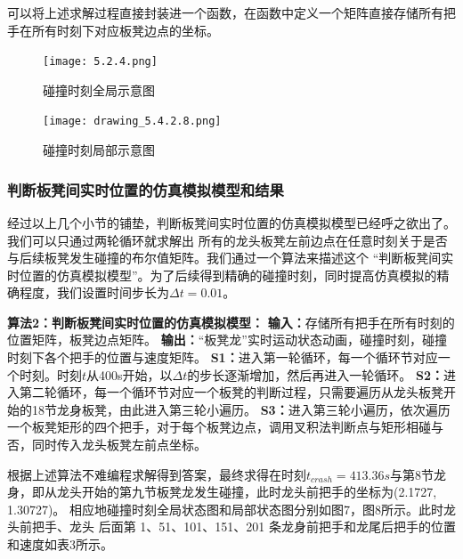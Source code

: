 \documentclass{cumcmthesis1}
\begin{document}
可以将上述求解过程直接封装进一个函数，在函数中定义一个矩阵直接存储所有把手在所有时刻下对应板凳边点的坐标。
\begin{figure}
    \caption{碰撞时刻全局示意图}
    \centering    
    \texttt{[image: 5.2.4.png]}
\end{figure}
\begin{figure}
    \caption{碰撞时刻局部示意图}
    \centering    
    \texttt{[image: drawing\_5.4.2.8.png]}
\end{figure}
\subsubsection{判断板凳间实时位置的仿真模拟模型和结果}
经过以上几个小节的铺垫，判断板凳间实时位置的仿真模拟模型已经呼之欲出了。我们可以只通过两轮循环就求解出
所有的龙头板凳左前边点在任意时刻关于是否与后续板凳发生碰撞的布尔值矩阵。我们通过一个算法来描述这个
“判断板凳间实时位置的仿真模拟模型”。为了后续得到精确的碰撞时刻，同时提高仿真模拟的精确程度，我们设置时间步长为$\Delta t=0.01$。
\par
\textbf{算法2：判断板凳间实时位置的仿真模拟模型：}
\newline
\noindent
\textbf{输入：}存储所有把手在所有时刻的位置矩阵，板凳边点矩阵。
\newline
\noindent
\textbf{输出：}“板凳龙”实时运动状态动画，碰撞时刻，碰撞时刻下各个把手的位置与速度矩阵。
\newline
\noindent
\textbf{S1：}进入第一轮循环，每一个循环节对应一个时刻。时刻$t$从400s开始，以$\Delta t$的步长逐渐增加，然后再进入一轮循环。
\newline
\noindent
\textbf{S2：}进入第二轮循环，每一个循环节对应一个板凳的判断过程，只需要遍历从龙头板凳开始的18节龙身板凳，由此进入第三轮小遍历。
\newline
\noindent
\textbf{S3：}进入第三轮小遍历，依次遍历一个板凳矩形的四个把手，对于每个板凳边点，调用叉积法判断点与矩形相碰与否，同时传入龙头板凳左前点坐标。
\par
根据上述算法不难编程求解得到答案，最终求得在时刻$t_{crash}=413.36s$与第8节龙身，即从龙头开始的第九节板凳龙发生碰撞，此时龙头前把手的坐标为(2.1727, 1.30727)。
相应地碰撞时刻全局状态图和局部状态图分别如图7，图8所示。此时龙头前把手、龙头
后面第 1、51、101、151、201 条龙身前把手和龙尾后把手的位置和速度如表3所示。
\end{document}
